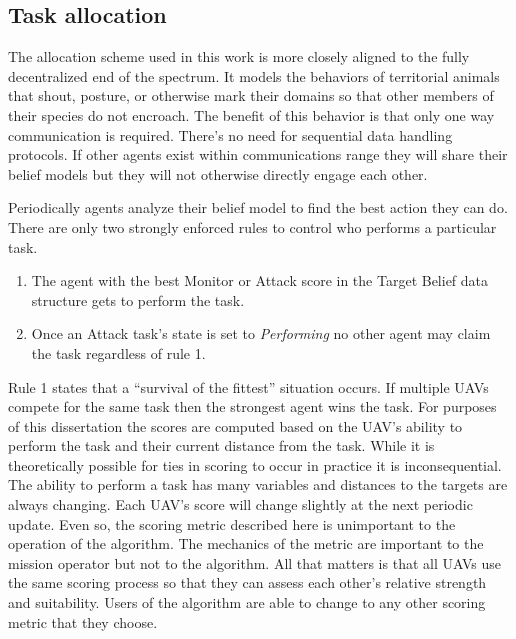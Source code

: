 
\subsection{Task allocation}
\label{sec:uncoordTaskingMyWork}


The allocation scheme used in this work is more closely aligned to the fully decentralized end of the spectrum.  It models the behaviors of territorial animals that shout, posture, or otherwise mark their domains so that other members of their species do not encroach.  The benefit of this behavior is that only one way communication is required.  There's no need for sequential data handling protocols.  If other agents exist within communications range they will share their belief models but they will not otherwise directly engage each other.  

Periodically agents analyze their belief model to find the best action they can do.  There are only two strongly enforced rules to control who performs a particular task.  

\begin{enumerate}
	\item The agent with the best Monitor or Attack score in the Target Belief data structure gets to perform the task.
	\item Once an Attack task's state is set to \textit{Performing} no other agent may claim the task regardless of rule 1.
\end{enumerate}

Rule 1 states that a ``survival of the fittest'' situation occurs.  If multiple UAVs compete for the same task then the strongest agent wins the task.  For purposes of this dissertation the scores are computed based on the UAV's ability to perform the task and their current distance from the task.  While it is theoretically possible for ties in scoring to occur in practice it is inconsequential.  The ability to perform a task has many variables and distances to the targets are always changing.  Each UAV's score will change slightly at the next periodic update.  Even so, the scoring metric described here is unimportant to the operation of the algorithm.  The mechanics of the metric are important to the mission operator but not to the algorithm.  All that matters is that all UAVs use the same scoring process so that they can assess each other's relative strength and suitability.  Users of the algorithm are able to change to any other scoring metric that they choose.

